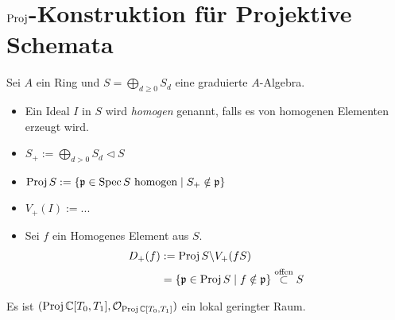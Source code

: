 \section{\boldmath$\operatorname{Proj}$-Konstruktion für Projektive Schemata}
\begin{comment}
siehe dazu
\begin{itemize}
\item 
\cite[Section 2.3.3]{liu2002algebraic}
\item 
\cite[Section 4.5]{ravil} 
\end{itemize}
\end{comment}
\begin{defn} 
Sei $A$ ein Ring und $S=\bigoplus_{d\geq0}S_d$ eine graduierte $A$-Algebra. 
\begin{itemize}
\item
Ein Ideal $I$ in $S$ wird \emph{homogen} genannt, falls es von homogenen
Elementen erzeugt wird. 
\item
$S_+:=\bigoplus_{d>0}S_d \vartriangleleft S$
\item
$\operatorname{Proj} S:=\{\mathfrak p \in\operatorname{Spec} S \text{ homogen} \mid
  S_+\notin\mathfrak p\}$
\item
$V_+(I):=...$
\item
Sei $f$ ein Homogenes Element aus $S$.
\begin{align*}
D_+(f)&:=\operatorname{Proj} S \backslash V_+(fS)
\\&=\left\{\mathfrak p \in\operatorname{Proj} S\mid f\notin \mathfrak p \right\}
  \overset{\text{offen}}\subset S
\end{align*}
\end{itemize}
\end{defn}

Es ist $(\operatorname{Proj} \mathbb{C}[T_0,T_1],\mathcal{O}_{\operatorname{Proj} \mathbb{C}[T_0,T_1]})$ ein lokal geringter Raum.

